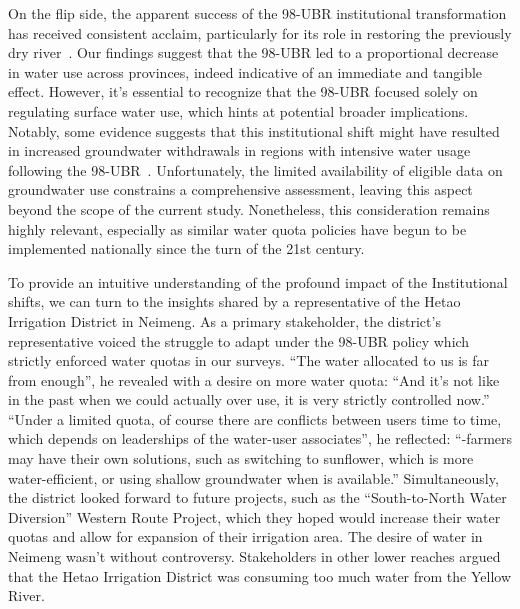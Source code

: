 \documentclass[preprint, 12pt]{elsarticle}
\begin{document}
On the flip side, the apparent success of the 98-UBR institutional transformation has received consistent acclaim, particularly for its role in restoring the previously dry river~\cite{wang2019e, wang2019d}.
Our findings suggest that the 98-UBR led to a proportional decrease in water use across provinces, indeed indicative of an immediate and tangible effect.
However, it's essential to recognize that the 98-UBR focused solely on regulating surface water use, which hints at potential broader implications.
Notably, some evidence suggests that this institutional shift might have resulted in increased groundwater withdrawals in regions with intensive water usage following the 98-UBR~\cite{sun2022b}.
Unfortunately, the limited availability of eligible data on groundwater use constrains a comprehensive assessment, leaving this aspect beyond the scope of the current study.
Nonetheless, this consideration remains highly relevant, especially as similar water quota policies have begun to be implemented nationally since the turn of the 21st century.

To provide an intuitive understanding of the profound impact of the Institutional shifts, we can turn to the insights shared by a representative of the Hetao Irrigation District in Neimeng.
As a primary stakeholder, the district's representative voiced the struggle to adapt under the 98-UBR policy which strictly enforced water quotas in our surveys.
``The water allocated to us is far from enough'', he revealed with a desire on more water quota: ``And it's not like in the past when we could actually over use, it is very strictly controlled now.''
``Under a limited quota, of course there are conflicts between users time to time, which depends on leaderships of the water-user associates'', he reflected: ``-farmers may have their own solutions, such as switching to sunflower, which is more water-efficient, or using shallow groundwater when is available.''
Simultaneously, the district looked forward to future projects, such as the ``South-to-North Water Diversion'' Western Route Project, which they hoped would increase their water quotas and allow for expansion of their irrigation area.
The desire of water in Neimeng wasn't without controversy. Stakeholders in other lower reaches argued that the Hetao Irrigation District was consuming too much water from the Yellow River.
\end{document}
